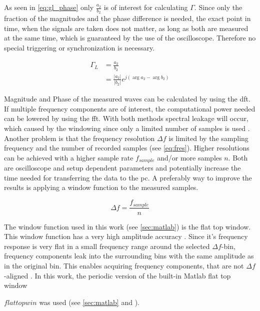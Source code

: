 \documentclass[12pt,a4paper,parskip=full,abstract=true,BCOR=10mm,twoside,open=right]{scrreprt}
\providecommand{\abs}[1]{\lvert#1\rvert}
\newcommand*{\SavedLstInline}{}
\DeclareRobustCommand*{\lstinline}{%
  \ifmmode
    \let\SavedBGroup\bgroup
    \def\bgroup{%
      \let\bgroup\SavedBGroup
      \hbox\bgroup
    }%
  \fi
  \SavedLstInline
}
\begin{document}
As seen in \cref{eq:gl_phase} only $\frac{a_2}{b_2}$ is
of interest for calculating $\Gamma$. Since only the fraction of the magnitudes
and the phase difference is needed, the exact point in time, when the signals are
taken does not matter, as long as both are measured at the same time, which is guaranteed
by the use of the oscilloscope. Therefore no special triggering or synchronization is necessary.

\begin{equation}\label{eq:gl_phase}
    \begin{split}
        \Gamma_L & = \frac{a_2}{b_2} \\
                 & = \frac{\abs{a_2}}{\abs{b_2}} e^{j(\arg{a_2}-\arg{b_2})}
    \end{split}
\end{equation}

Magnitude and Phase of the measured waves can be calculated by using
the \gls{dft}. If multiple frequency components are of interest, the computational
power needed can be lowered by using the \gls{fft}. With both methods
spectral leakage will occur, which caused by the windowing since only a limited number of samples is used \cite{harris_use_1978}.
Another problem is that the frequency resolution $\Delta{}f$ is limited by the sampling
frequency and the number of recorded samples (see \cref{eq:fres}). Higher resolutions
can be achieved with a higher sample rate $f_{sample}$ and/or more samples $n$. Both are oscilloscope and setup
dependent parameters and potentially increase the time needed for transferring the data to the
\gls{pc}. A preferably way to improve the results is applying a window function to the
measured samples.

\begin{equation}
    \label{eq:fres} \Delta{}f = \frac{f_{sample}}{n}
\end{equation}

The window function used in this work (see \cref{sec:matlab}) is the flat top window.
This window function has a very high amplitude accuracy \cite{heinzel_spectrum_2002}.
Since it's frequency response is very flat in a small frequency range around the selected $\Delta{}f$-bin, frequency components leak
into the surrounding bins with the same amplitude as in the original bin. This enables acquiring frequency components, that are not $\Delta{}f$-aligned \cite{heinzel_spectrum_2002}.
In this work, the periodic version of the built-in Matlab flat top window \lstinline$flattopwin$
was used (see \cref{sec:matlab} and \cite{matlab_flattop}).
\end{document}
